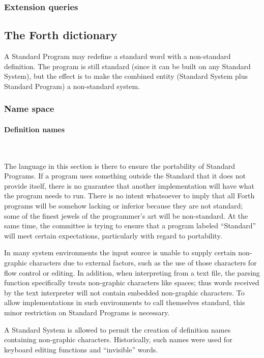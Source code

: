 \subsubsection{Extension queries} %

\subsection{The Forth dictionary} %

A Standard Program may redefine a standard word with a non-standard
definition. The program is still standard (since it can be built on
any Standard System), but the effect is to make the combined entity
(Standard System plus Standard Program) a non-standard system.

\subsubsection{Name space} %

\setcounter{paragraph}{1}
\paragraph{Definition names} ~ %

The language in this section is there to ensure the portability of
Standard Programs. If a program uses something outside the Standard
that it does not provide itself, there is no guarantee that another
implementation will have what the program needs to run. There is no
intent whatsoever to imply that all Forth programs will be somehow
lacking or inferior because they are not standard; some of the finest
jewels of the programmer's art will be non-standard. At the same time,
the committee is trying to ensure that a program labeled ``Standard''
will meet certain expectations, particularly with regard to portability.

In many system environments the input source is unable to supply
certain non-graphic characters due to external factors, such as the
use of those characters for flow control or editing. In addition,
when interpreting from a text file, the parsing function specifically
treats non-graphic characters like spaces; thus words received by the
text interpreter will not contain embedded non-graphic characters. To
allow implementations in such environments to call themselves standard,
this minor restriction on Standard Programs is necessary.

A Standard System is allowed to permit the creation of definition
names containing non-graphic characters. Historically, such names
were used for keyboard editing functions and ``invisible'' words.

